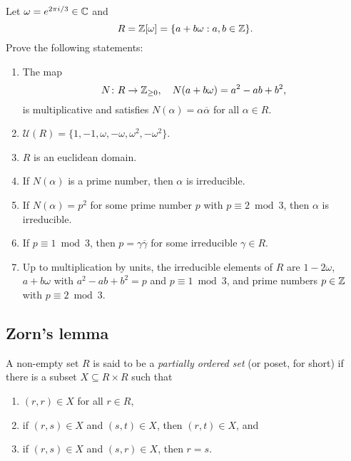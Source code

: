 \begin{bonus}
    \label{xca:Eisenstein}
    Let $\omega=e^{2\pi i/3}\in\mathbb{C}$ and 
    \[
    R=\mathbb{Z}[\omega]=\{a+b\omega:a,b\in\mathbb{Z}\}.
    \]
    Prove the following statements:
    \begin{enumerate}
        \item The map 
        \[
        N\colon R\to\mathbb{Z}_{\geq0},
        \quad
        N(a+b\omega)=a^2-ab+b^2,
        \]
        is multiplicative and 
        satisfies $N(\alpha)=\alpha\overline{\alpha}$
        for all $\alpha\in R$. 
        \item $\mathcal{U}(R)=\{1,-1,\omega,-\omega,\omega^2,-\omega^2\}$.
        \item $R$ is an euclidean domain.
        \item If $N(\alpha)$ is a prime number, then $\alpha$ is irreducible. 
        \item If $N(\alpha)=p^2$ for some 
            prime number $p$ with $p\equiv 2\bmod 3$, then 
            $\alpha$ is irreducible. 
        \item If $p\equiv 1\bmod 3$, then 
            $p=\gamma\overline{\gamma}$ for some 
            irreducible $\gamma\in R$.
        \item Up to multiplication by units, 
            the irreducible elements of $R$ are $1-2\omega$, 
            $a+b\omega$ with $a^2-ab+b^2=p$ and $p\equiv 1\bmod 3$, 
            and prime numbers $p\in\mathbb{Z}$ with $p\equiv 2\bmod 3$.
    \end{enumerate}
\end{bonus}


\subsection{Zorn's lemma}

\begin{definition}
A non-empty set $R$ is said to be a \emph{partially ordered set} (or poset, for short) 
if there is a subset $X\subseteq R\times R$ such that
\begin{enumerate}
    \item $(r,r)\in X$ for all $r\in R$, 
    \item if $(r,s)\in X$ and $(s,t)\in X$, then $(r,t)\in X$, and 
    \item if $(r,s)\in X$ and $(s,r)\in X$, then $r=s$. 
\end{enumerate}
\end{definition}

